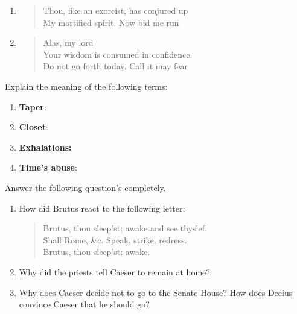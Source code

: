 \documentclass[12pt]{article} %
\begin{document}
\begin{qstn}
\begin{enumerate}
    \item
        \begin{verse}
          Thou, like an exorcist, has conjured up \\
          My mortified spirit. Now bid me run
        \end{verse}
          \newpage
    \item
        \begin{verse}
          Alas, my lord\\
          Your wisdom is consumed in confidence. \\
          Do not go forth today. Call it may fear
        \end{verse}

  \end{enumerate}


\end{qstn}

\vspace*{6cm}


\begin{qstn}
  Explain the meaning of the following terms:
  \begin{enumerate}
    \item \textbf{Taper}:

       \vspace*{3cm}

    \item \textbf{Closet}:
       \vspace*{3cm}

    \item \textbf{Exhalations:}
       \vspace*{3cm}

    \item \textbf{Time's abuse}:
       \vspace*{3cm}

  \end{enumerate}



\end{qstn}


\begin{qstn}
  Answer the following question's completely.
  \begin{enumerate}
    \item How did Brutus react to the following letter:
        \begin{verse}
          Brutus, thou sleep'st; awake and see thyslef.\\
          Shall Rome, \&c. Speak, strike, redress. \\
          Brutus, thou sleep'st; awake.
        \end{verse}
\vspace*{6cm}

    \item Why did the priests tell Caeser to remain at home?
\vspace*{4cm}

    \item Why does Caeser decide not to go to the Senate House? How does Decius convince Caeser that he should go?
  \end{enumerate}

\end{qstn}
\end{document}
